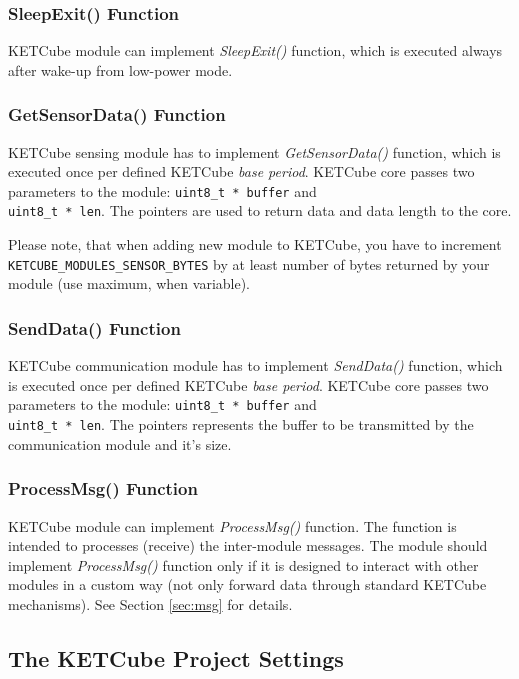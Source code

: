 \documentclass[twoside,a4paper]{refart}
\begin{document}
\subsubsection*{SleepExit() Function}
KETCube module can implement {\it SleepExit()} function, which is executed always after wake-up from low-power mode.

\subsubsection*{GetSensorData() Function}
KETCube sensing module has to implement {\it GetSensorData()} function, which is executed once per defined KETCube {\it base period}. KETCube core passes two parameters to the module: {\tt uint8\_t * buffer} and\\{\tt uint8\_t * len}. The pointers are used to return data and data length to the core.

Please note, that when adding new module to KETCube, you have to increment {\tt KETCUBE\_MODULES\_SENSOR\_BYTES} by at least number of bytes returned by your module (use maximum, when variable).

\subsubsection*{SendData() Function}
KETCube communication module has to implement {\it SendData()} function, which is executed once per defined KETCube {\it base period}. KETCube core passes two parameters to the module: {\tt uint8\_t * buffer} and\\{\tt uint8\_t * len}. The pointers represents the buffer to be transmitted by the communication module and it's size.

\subsubsection*{ProcessMsg() Function}
KETCube module can implement {\it ProcessMsg()} function. The function is intended to processes (receive) the inter-module messages. The module should implement {\it ProcessMsg()} function only if it is designed to interact with other modules in a custom way (not only forward data through standard KETCube mechanisms). See Section \ref{sec:msg} for details.

\clearpage
\subsection{The KETCube Project Settings}\label{sec:creation:core}
\end{document}
